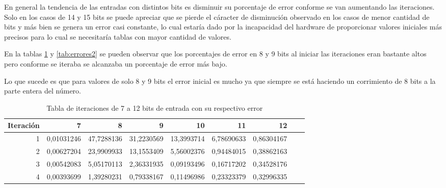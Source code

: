En general la tendencia de las entradas con distintos bits es disminuir su porcentaje de error conforme se van aumentando las iteraciones. Solo en los casos de 14 y 15 bits se puede apreciar que se pierde el cáracter de disminución observado en los casos de menor cantidad de bits y más bien se genera un error casi constante, lo cual estaría dado por la incapacidad del hardware de proporcionar valores iniciales más precisos para lo cual se necesitaría tablas con mayor cantidad de valores.

En la tablas \ref{tab:errores1} y \ref{tab:errores2} se pueden observar que los porcentajes de error en 8 y 9 bits al iniciar las iteraciones eran bastante altos pero conforme se iteraba se alcanzaba un porcentaje de error más bajo.  

Lo que sucede es que para valores de solo 8 y 9 bits el error inicial es mucho ya que siempre se está haciendo un corrimiento de 8 bits a la parte entera del número. 

\begin{table}[htbp]
  \centering
  \caption{Tabla de iteraciones de 7 a 12 bits de entrada con su respectivo error}
    \begin{tabular}{rrrrrrrrr}
    \toprule
    Iteración     & 7     & 8     & 9     & 10    & 11    & 12\\
    \midrule
    1    & 0,01031246 & 47,7288136 & 31,2230569 & 13,3993714 & 6,78690633 & 0,86304167\\
    2    & 0,00627204 & 23,9909933 & 13,1553409 & 5,56002376 & 0,94484015 & 0,38862163\\
    3    & 0,00542083 & 5,05170113 & 2,36331935 & 0,09193496 & 0,16717202 & 0,34528176\\
    4    & 0,00393699 & 1,39280231 & 0,79338167 & 0,11496986 & 0,23323379 & 0,32996335\\
    \bottomrule
    \end{tabular}%
  \label{tab:errores1}%
\end{table}%


